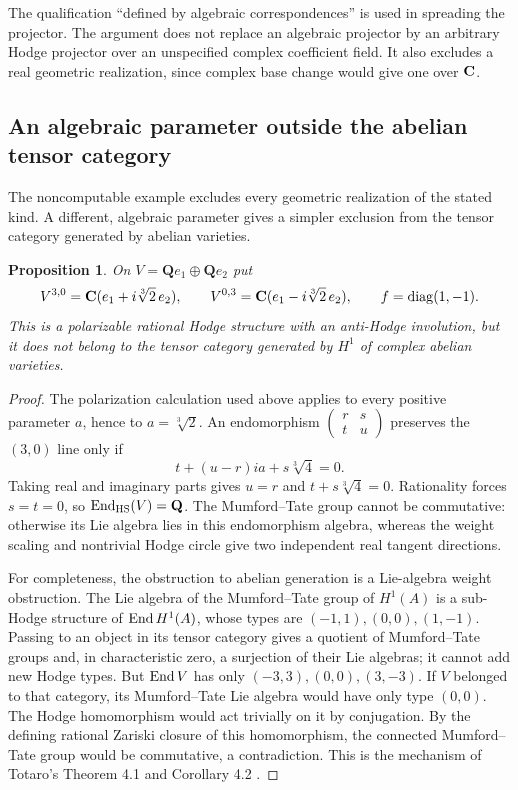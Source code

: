 \documentclass[11pt]{article}
\newtheorem{proposition}[theorem]{Proposition}
\theoremstyle{definition}\newtheorem{definition}[theorem]{Definition}
\theoremstyle{remark}\newtheorem{remark}[theorem]{Remark}
\newcommand{\Q}{\mathbf Q}\newcommand{\Z}{\mathbf Z}
\begin{document}
The qualification ``defined by algebraic correspondences'' is used in spreading the projector. The argument does not replace an algebraic projector by an arbitrary Hodge projector over an unspecified complex coefficient field. It also excludes a real geometric realization, since complex base change would give one over $\mathbf C$.

\subsection{An algebraic parameter outside the abelian tensor category}
The noncomputable example excludes every geometric realization of the stated kind. A different, algebraic parameter gives a simpler exclusion from the tensor category generated by abelian varieties.

\begin{proposition}\label{prop:nonabelian-pair}
On $V=\Q e_1\oplus\Q e_2$ put
\[
 V^{3,0}=\mathbf C(e_1+i\sqrt[3]{2}\,e_2),\qquad
 V^{0,3}=\mathbf C(e_1-i\sqrt[3]{2}\,e_2),\qquad
 f=\operatorname{diag}(1,-1).
\]
This is a polarizable rational Hodge structure with an anti-Hodge involution, but it does not belong to the tensor category generated by $H^1$ of complex abelian varieties.
\end{proposition}
\begin{proof}
The polarization calculation used above applies to every positive parameter $a$, hence to $a=\sqrt[3]{2}$. An endomorphism $\left(\begin{smallmatrix}r&s\\t&u\end{smallmatrix}\right)$ preserves the $(3,0)$ line only if
\[
             t+(u-r)ia+s\sqrt[3]{4}=0.
\]
Taking real and imaginary parts gives $u=r$ and $t+s\sqrt[3]{4}=0$. Rationality forces $s=t=0$, so $\End_{\mathrm{HS}}(V)=\Q$. The Mumford--Tate group cannot be commutative: otherwise its Lie algebra lies in this endomorphism algebra, whereas the weight scaling and nontrivial Hodge circle give two independent real tangent directions.

For completeness, the obstruction to abelian generation is a Lie-algebra weight obstruction. The Lie algebra of the Mumford--Tate group of $H^1(A)$ is a sub-Hodge structure of $\operatorname{End} H^1(A)$, whose types are $(-1,1),(0,0),(1,-1)$. Passing to an object in its tensor category gives a quotient of Mumford--Tate groups and, in characteristic zero, a surjection of their Lie algebras; it cannot add new Hodge types. But $\operatorname{End} V$ has only $(-3,3),(0,0),(3,-3)$. If $V$ belonged to that category, its Mumford--Tate Lie algebra would have only type $(0,0)$. The Hodge homomorphism would act trivially on it by conjugation. By the defining rational Zariski closure of this homomorphism, the connected Mumford--Tate group would be commutative, a contradiction. This is the mechanism of Totaro's Theorem 4.1 and Corollary 4.2 \cite[p.~18]{Totaro}.
\end{proof}
\end{document}
